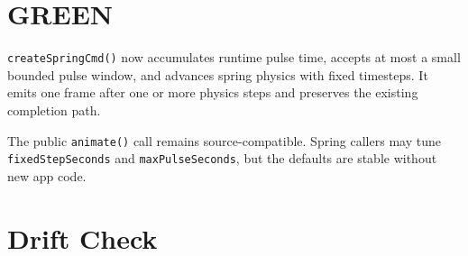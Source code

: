 \section{GREEN}\label{record-161-green}

\texttt{c\allowbreak{}r\allowbreak{}e\allowbreak{}a\allowbreak{}t\allowbreak{}e\allowbreak{}S\allowbreak{}p\allowbreak{}r\allowbreak{}i\allowbreak{}n\allowbreak{}g\allowbreak{}C\allowbreak{}m\allowbreak{}d\allowbreak{}(\allowbreak{})} now accumulates runtime pulse time, accepts at most a small bounded pulse window, and advances spring physics with fixed timesteps. It emits one frame after one or more physics steps and preserves the existing completion path.

The public \texttt{a\allowbreak{}n\allowbreak{}i\allowbreak{}m\allowbreak{}a\allowbreak{}t\allowbreak{}e\allowbreak{}(\allowbreak{})} call remains source-compatible. Spring callers may tune \texttt{f\allowbreak{}i\allowbreak{}x\allowbreak{}e\allowbreak{}d\allowbreak{}S\allowbreak{}t\allowbreak{}e\allowbreak{}p\allowbreak{}S\allowbreak{}e\allowbreak{}c\allowbreak{}o\allowbreak{}n\allowbreak{}d\allowbreak{}s} and \texttt{m\allowbreak{}a\allowbreak{}x\allowbreak{}P\allowbreak{}u\allowbreak{}l\allowbreak{}s\allowbreak{}e\allowbreak{}S\allowbreak{}e\allowbreak{}c\allowbreak{}o\allowbreak{}n\allowbreak{}d\allowbreak{}s}, but the defaults are stable without new app code.

\section{Drift Check}\label{record-161-drift-check}


